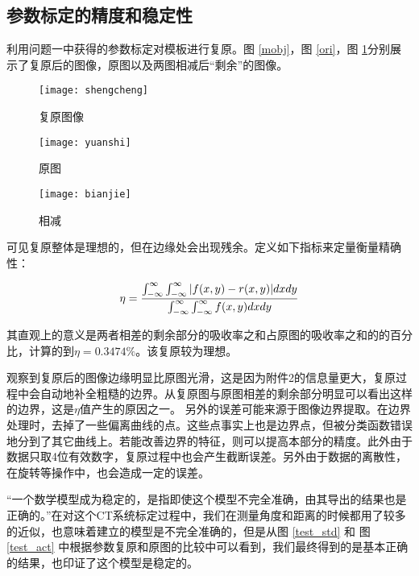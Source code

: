 \documentclass[withoutpreface,bwprint]{cumcmthesis} %
\begin{document}
  \subsection{参数标定的精度和稳定性}

    利用问题一中获得的参数标定对模板进行复原。图 \ref{mobj}，图 \ref{ori}，图 \ref{com}分别展示了复原后的图像，原图以及两图相减后“剩余”的图像。
    \begin{figure}[!htbp]
      \begin{minipage}[t]{0.3\linewidth}
        \centering
        \texttt{[image: shengcheng]}
        \caption{复原图像}
        \label{mobj}
      \end{minipage}
      \begin{minipage}[t]{0.3\linewidth}
        \centering
        \texttt{[image: yuanshi]}
        \caption{原图}
        \label{ori}
      \end{minipage}
      \begin{minipage}[t]{0.3\linewidth}
        \centering
        \texttt{[image: bianjie]}
        \caption{相减}
        \label{com}
      \end{minipage}
    \end{figure}

    可见复原整体是理想的，但在边缘处会出现残余。定义如下指标来定量衡量精确性：


    \begin{equation}
      \eta =\frac{\large\int_{-\infty}^{\infty}\large\int_{-\infty}^{\infty}{|f(x, y) - r(x, y)|}dxdy}{\large\int_{-\infty}^{\infty}\large\int_{-\infty}^{\infty}f(x, y)dxdy}
    \end{equation}

    其直观上的意义是两者相差的剩余部分的吸收率之和占原图的吸收率之和的的百分比，计算的到$\eta =  0.3474\%$。该复原较为理想。

    观察到复原后的图像边缘明显比原图光滑，这是因为附件2的信息量更大，复原过程中会自动地补全粗糙的边界。从复原图与原图相差的剩余部分明显可以看出这样的边界，这是$\eta$值产生的原因之一。
    另外的误差可能来源于图像边界提取。在边界处理时，去掉了一些偏离曲线的点。这些点事实上也是边界点，但被分类函数错误地分到了其它曲线上。若能改善边界的特征，则可以提高本部分的精度。此外由于数据只取4位有效数字，复原过程中也会产生截断误差。另外由于数据的离散性，在旋转等操作中，也会造成一定的误差。

    “一个数学模型成为稳定的，是指即使这个模型不完全准确，由其导出的结果也是正确的。”\cite{moxk}在对这个CT系统标定过程中，我们在测量角度和距离的时候都用了较多的近似，也意味着建立的模型是不完全准确的，但是从图 \ref{test_std} 和 图 \ref{test_act} 中根据参数复原和原图的比较中可以看到，我们最终得到的是基本正确的结果，也印证了这个模型是稳定的。
\end{document}
